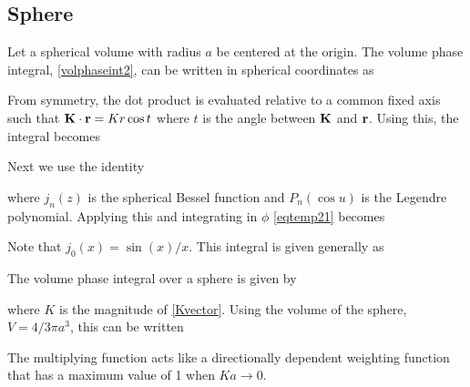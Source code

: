 \subsection{Sphere}

\label{sectionvolintsphere}
Let a spherical volume with radius $a$ be centered at the origin. The volume phase integral, \eqref{volphaseint2}, can be written in spherical coordinates as 
\vspace{-2mm}

From symmetry, the dot product is evaluated relative to a common fixed axis such that $\mathbf{K} \cdot \mathbf{r} = K r \cos t$  where $t$ is the angle between $\mathbf{K}$ and $\mathbf{r}$. Using this, the integral becomes
\vspace{-2mm}

Next we use the identity 

\noindent where $j_n(z)$ is the spherical Bessel function and $P_n(\cos u)$ is the Legendre polynomial. Applying this and integrating in $\phi$ \eqref{eqtemp21} becomes

Note that $j_0(x) = \sin(x)/x $.  This integral is given generally as

The volume phase integral over a sphere is given by

\noindent where $K$ is the magnitude of \eqref{Kvector}.  Using the volume of the sphere, $V = 4/3 \pi a^3$, this can be written

%
%
%

The multiplying function acts like a directionally dependent weighting function that has a maximum value of 1 when $K a \rightarrow 0$.  

